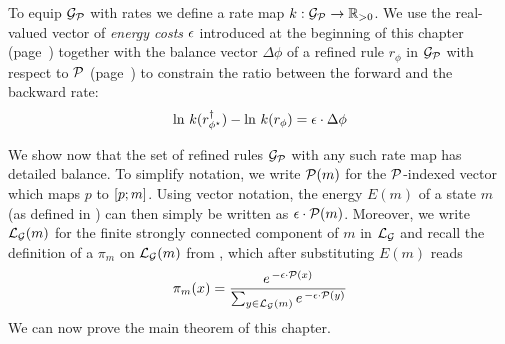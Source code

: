 To equip $\mathcal{G}_{\mathcal{P}}$ with rates
we define a rate map $k: \mathcal{G}_{\mathcal{P}} \to \mathbb{R}_{>0}$.
We use the real-valued vector of \emph{energy costs} $\epsilon$
introduced at the beginning of this chapter
(page~\pageref{chp:direct})
together with the balance vector $\Delta\phi$
of a refined rule $r_\phi$ in $\mathcal{G}_{\mathcal{P}}$
with respect to $\mathcal{P}$
(page~\pageref{p:balance-vector})
to constrain the ratio
between the forward and the backward rate:
\begin{equation}
  \label{eq:rates}
  \ln\, {k(r^\dagger_{\phi^\star})} - \ln\, {k(r_\phi)} =
  \epsilon \cdot \Delta\phi
\end{equation}

We show now that the set of refined rules $\mathcal{G}_{\mathcal{P}}$
with any such rate map
has detailed balance.
To simplify notation,
we write $\mathcal{P}(m)$
for the $\mathcal{P}$-indexed vector
which maps $p$ to $\left[p;m\right]$.
Using vector notation,
the energy $E(m)$ of a state $m$
(as defined in )
can then simply be written as $\epsilon \cdot \mathcal{P}(m)$.
Moreover, we write $\mathcal{L}_{\mathcal{G}}(m)$ for the finite
strongly connected component of $m$ in $\mathcal{L}_{\mathcal{G}}$
and recall the definition of a \pmf
$\pi_m$ on $\mathcal{L}_{\mathcal{G}}(m)$ from ,
which after substituting $E(m)$ reads
\begin{equation}
  \label{eq:boltzmann}
  \pi_m(x) = \dfrac{
    e^{\,-\epsilon \cdot \mathcal{P}(x)}}{
    \sum_{y \in \mathcal{L}_{\mathcal{G}}(m)} e^{\,-\epsilon \cdot \mathcal{P}(y)}}
\end{equation}
%
We can now prove the main theorem of this chapter.

